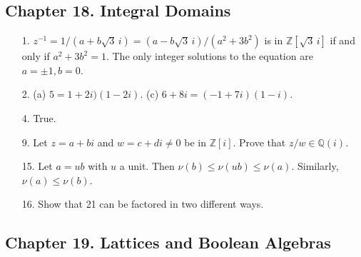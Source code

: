 \subsection*{Chapter 18. Integral Domains}
 
{\small
\begin{itemize}
 
\item[1.]
$z^{-1} = 1/(a + b\sqrt{3}\, i) = (a -b \sqrt{3}\, i)/(a^2 + 3b^2)$ is in
${\mathbb Z}[\sqrt{3}\, i]$ if and only if $a^2 + 3 b^2 = 1$.  The only
integer solutions to the equation are $a = \pm 1, b = 0$.

 
\item[2.]
(a) $5 = 1 + 2i)(1 -2i)$.
(c) $6 + 8i = (-1+7i)(1-i)$.
 
\item[4.]
True.


\item[9.]
Let $z=a + bi$ and $w=c + di \neq 0$ be in ${\mathbb Z}[i]$. Prove that
$z/w \in {\mathbb Q}(i)$.



 
\item[15.]
Let $a = ub$ with $u$ a unit. Then $\nu(b) \leq \nu(ub) \leq \nu(a)$.
Similarly, $\nu(a) \leq \nu(b)$.
 

\item[16.]
Show that 21 can be factored in two different ways.



\end{itemize}
}



\subsection*{Chapter 19. Lattices and Boolean Algebras}
 
